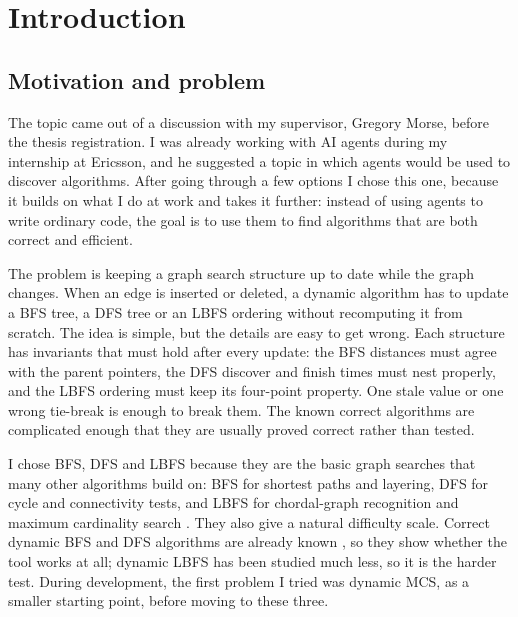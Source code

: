\chapter{Introduction}
\label{ch:introduction}

\section{Motivation and problem}
\label{sec:motivation}

The topic came out of a discussion with my supervisor, Gregory Morse, before the
thesis registration. I was already working with AI agents during my internship
at Ericsson, and he suggested a topic in which agents would be used to discover
algorithms. After going through a few options I chose this one, because it
builds on what I do at work and takes it further: instead of using agents to
write ordinary code, the goal is to use them to find algorithms that are both
correct and efficient.

The problem is keeping a graph search structure up to date while the graph
changes. When an edge is inserted or deleted, a dynamic algorithm has to update
a BFS tree, a DFS tree or an LBFS ordering without recomputing it from scratch.
The idea is simple, but the details are easy to get wrong. Each structure has
invariants that must hold after every update: the BFS distances must agree with
the parent pointers, the DFS discover and finish times must nest properly, and
the LBFS ordering must keep its four-point property. One stale value or one
wrong tie-break is enough to break them. The known correct algorithms
\citep{demetrescu2005dynamic,even1981maintaining,friglioni2000,
yang2019dynamic,baswana2019dynamic,baswana2017,corneil2008unified} are
complicated enough that they are usually proved correct rather than tested.

I chose BFS, DFS and LBFS because they are the basic graph searches that many
other algorithms build on: BFS for shortest paths and layering, DFS for cycle
and connectivity tests, and LBFS for chordal-graph recognition and maximum
cardinality search \citep{morse2026bfs,brandstadt1997lexbfs,habib2000lexbfs,
berry2004mcs}. They also give a natural difficulty scale. Correct dynamic BFS
and DFS algorithms are already known \citep{yang2019dynamic,morse2026bfs}, so
they show whether the tool works at all; dynamic LBFS has been studied much
less, so it is the harder test. During development, the first problem I tried
was dynamic MCS, as a smaller starting point, before moving to these three.

